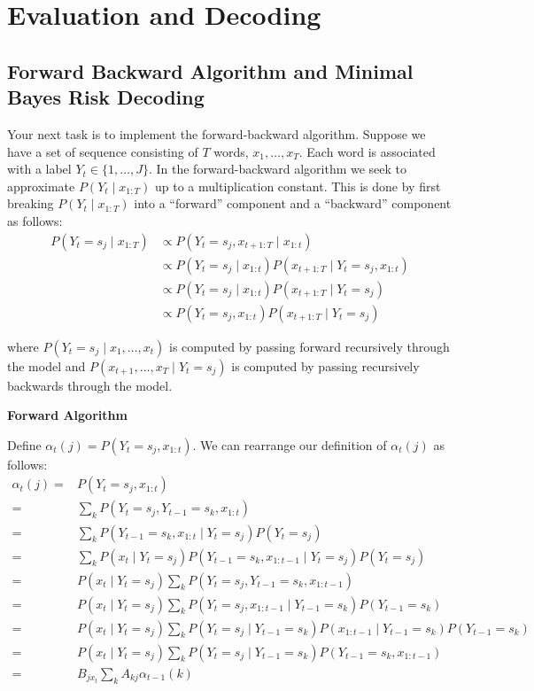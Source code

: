 \documentclass[11pt,addpoints,answers]{exam}
\begin{document}
\newpage

\section{Evaluation and Decoding}
\label{forback}

\subsection{Forward Backward Algorithm and Minimal Bayes Risk Decoding}

Your next task is to implement the forward-backward algorithm. Suppose we have a set of sequence consisting of $T$ words, $x_1,\dots,x_T$. Each word is associated with a label $Y_t\in\{1,\dots,J\}$. In the forward-backward algorithm we seek to approximate $P(Y_t \mid x_{1:T})$ up to a multiplication constant. This is done by first breaking $P(Y_t \mid x_{1:T})$ into a ``forward'' component and a ``backward'' component as follows:
\begin{align*}
   P(Y_t =s_j \mid x_{1:T}) &\propto P(Y_t=s_j,x_{t+1:T} \mid x_{1:t})\\
   &\propto P(Y_t=s_j \mid x_{1:t})P(x_{t+1:T} \mid Y_t=s_j, x_{1:t})\\
    &\propto P(Y_t=s_j \mid x_{1:t})P(x_{t+1:T} \mid Y_t=s_j)\\ 
     &\propto P(Y_t=s_j, x_{1:t})P(x_{t+1:T} \mid Y_t=s_j) 
\end{align*}



where $P(Y_t=s_j \mid x_1,\dots,x_{t})$ is computed by passing forward recursively through the model and $P(x_{t+1},\dots,x_T \mid Y_t=s_j)$ is computed by passing recursively backwards through the model.

\textbf{Forward Algorithm}



Define $\alpha_t(j) = P(Y_t = s_j, x_{1:t})$. We can rearrange our definition of $\alpha_t(j)$ as follows:
\begin{align}
    \label{eqn:alpha}
    \alpha_t(j)
    =&P(Y_t=s_j, x_{1:t}) \nonumber\\
    =& \sum_{k} P(Y_t=s_j, Y_{t-1}=s_k, x_{1:t}) \nonumber\\
    =& \sum_{k} P(Y_{t-1}=s_k, x_{1:t} \mid Y_t = s_j) P(Y_t = s_j) \nonumber\\
    =& \sum_{k} P(x_t \mid Y_t = s_j) P(Y_{t-1}=s_k, x_{1:t-1} \mid Y_t = s_j) P(Y_t = s_j) \nonumber\\
    =& P(x_t \mid Y_t = s_j) \sum_{k} P(Y_t = s_j, Y_{t-1}=s_k, x_{1:t-1}) \nonumber\\
    =& P(x_t \mid Y_t = s_j) \sum_{k} P(Y_t = s_j, x_{1:t-1} \mid Y_{t-1}=s_k) P(Y_{t-1}=s_k) \nonumber\\
    =& P(x_t \mid Y_t = s_j) \sum_{k} P(Y_t = s_j \mid Y_{t-1}=s_k) P(x_{1:t-1} \mid Y_{t-1}=s_k) P(Y_{t-1}=s_k) \nonumber\\
    =& P(x_t \mid Y_t = s_j) \sum_{k} P(Y_t = s_j \mid Y_{t-1}=s_k) P(Y_{t-1}=s_k, x_{1:t-1}) \nonumber\\
    =& B_{jx_t} \sum_{k} A_{kj} \alpha_{t-1}(k)
\end{align}
\end{document}
